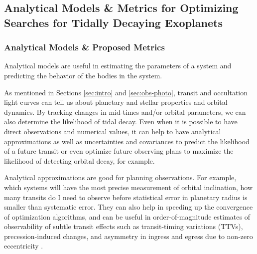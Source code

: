 \documentclass[oneside,12pt]{amsart}
\numberwithin{page}{section}
\begin{document}





\subsection{Analytical Models \& Metrics for Optimizing Searches for Tidally Decaying Exoplanets}\label{sec:models}

\subsubsection{Analytical Models \& Proposed Metrics}

Analytical models are useful in estimating the parameters of a system and predicting the behavior of the bodies in the system. 

As mentioned in Sections \ref{sec:intro} and \ref{sec:obs-photo}, transit and occultation light curves can tell us about planetary and stellar properties and orbital dynamics. By tracking changes in mid-times and/or orbital parameters, we can also determine the likelihood of tidal decay. Even when it is possible to have direct observations and numerical values, it can help to have analytical approximations as well as uncertainties and covariances to predict the likelihood of a future transit or even optimize future observing plans to maximize the likelihood of detecting orbital decay, for example.

Analytical approximations are good for planning observations. For example, which systems will have the most precise measurement of orbital inclination, how many transits do I need to observe before statistical error in planetary radius is smaller than systematic error. They can also help in speeding up the convergence of optimization algorithms, and can be useful in order-of-magnitude estimates of observability of subtle transit effects such as transit-timing variations (TTVs), precession-induced changes, and asymmetry in ingress and egress due to non-zero eccentricity \citep{carter2008analytic}.
\end{document}
